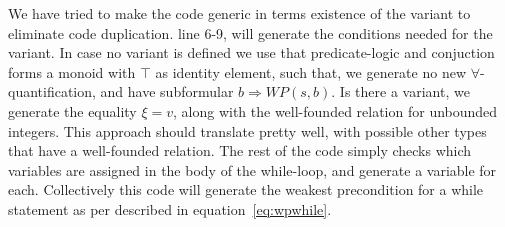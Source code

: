 We have tried to make the code generic in terms existence of the variant to eliminate code duplication.
line 6-9, will generate the conditions needed for the variant.
In case no variant is defined we use that predicate-logic and conjuction forms a monoid with $\top$ as identity element, such that, we generate no new $\forall$-quantification, and have subformular $b \Rightarrow WP(s,b)$.
Is there a variant, we generate the equality $\xi = v$, along with the well-founded relation for unbounded integers. This approach should translate pretty well, with possible other types that have a well-founded relation. The rest of the code simply checks which variables are assigned in the body of the while-loop, and generate a variable for each. Collectively this code will generate the weakest precondition for a while statement as per described in equation~\ref{eq:wpwhile}.
